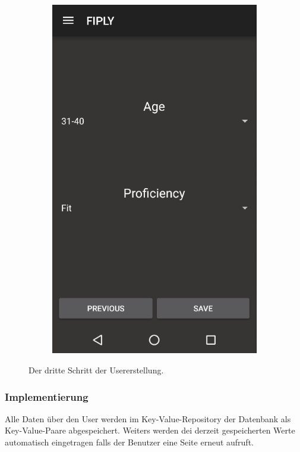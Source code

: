 \documentclass[FIPLY_base.tex]{subfiles}
\begin{document}
\begin{figure}[H]
	\begin{subfigure}[b]{0.3\textwidth}
	\includegraphics[scale=0.55]{img/User_step3}
	\end{subfigure}
	\hfil
	\caption{Der dritte Schritt der Usererstellung.}
\end{figure}

\subsubsection{Implementierung}
Alle Daten über den User werden im Key-Value-Repository der Datenbank als Key-Value-Paare abgespeichert. 
Weiters werden dei derzeit gespeicherten Werte automatisch eingetragen falls der Benutzer eine Seite erneut aufruft.
\end{document}
